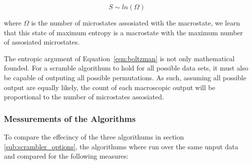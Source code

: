 		\begin{equation}
			S \sim ln(\Omega)
			\label{eqn:boltzman}
		\end{equation}

		where $\Omega$ is the number of microstates assosiated with the macrostate, we learn that this state of maximum entropy is a macrostate with the maximum number of assosiated microstates.
		\par
		The entropic argument of Equation~\ref{eqn:boltzman} is not only mathematical founded.
		For a scramble algorithum to hold for all possible data sets, it must also be capable of outputing all possible permutations.
		As such, assuming all possible output are equally likely, the count of each macroscopic output will be proportional to the number of microstates assosiated.

		\subsubsection{Messurements of the Algorithms} 
		\label{subsub:messurements_of_the_algorithms}

			To compare the effecincy of the three algorithums in section \ref{sub:scrambler_options}, the algorithums where run over the same unput data and compared for the following measures:

